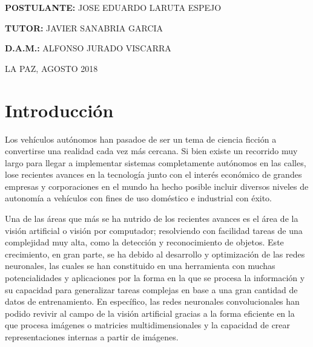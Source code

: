 \documentclass[12pt,letterpaper]{article}
\begin{document}
\begin{titlepage}
\begin{center}
\vspace*{0.2in}


\begin{large}
\textbf{POSTULANTE:} JOSE EDUARDO LARUTA ESPEJO\\
\end{large}

\begin{large}
\hspace{0.08in} \textbf{TUTOR:} JAVIER SANABRIA GARCIA\\
\end{large}

\begin{large}
\hspace{0.44in} \textbf{D.A.M.:} ALFONSO JURADO VISCARRA\\
\end{large}

\vspace*{0.2in}



\begin{normalsize}
LA PAZ, AGOSTO 2018\\
\end{normalsize}
\end{center}
\end{titlepage}


\thispagestyle{empty}
\tableofcontents
\newpage



\section{Introducción}

Los vehículos autónomos han pasadoe de ser un tema de ciencia ficción a convertirse una realidad cada vez más 
cercana. Si bien existe un recorrido muy largo para llegar a implementar sistemas completamente autónomos en las calles, 
lose recientes avances en la tecnología junto con el interés económico de grandes empresas y corporaciones en el mundo 
ha hecho posible incluir diversos niveles de autonomía a vehículos con fines de uso doméstico e industrial con éxito.

Una de las áreas que más se ha nutrido de los recientes avances es el área de la visión artificial o visión por computador; 
resolviendo con facilidad tareas de una complejidad muy alta, como la detección y reconocimiento de objetos. 
Este crecimiento, en gran parte, se ha debido al desarrollo y optimización de las redes neuronales, las cuales se han 
constituido en una herramienta con muchas potencialidades y aplicaciones por la forma en la que se procesa la información 
y su capacidad para generalizar tareas complejas en base a una gran cantidad de datos de entrenamiento. En específico, 
las redes neuronales convolucionales han podido revivir al campo de la visión artificial gracias a la forma eficiente 
en la que procesa imágenes o matricies multidimensionales y la capacidad de crear representaciones internas a partir de imágenes.
\end{document}
